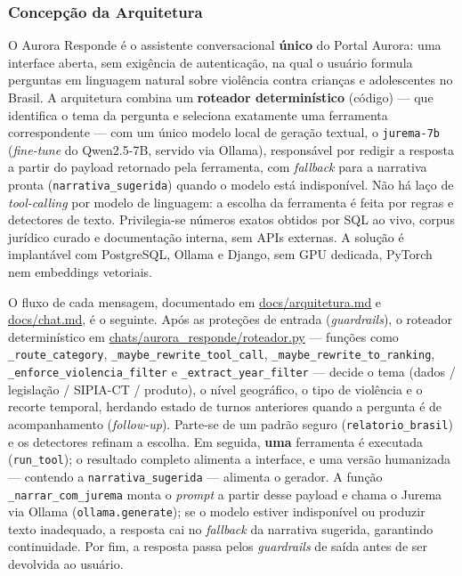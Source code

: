\documentclass[11pt,a4paper]{article}
\begin{document}
\subsubsection{Concepção da Arquitetura}
\label{subsubsec:arquitetura_meta4}

O Aurora Responde é o assistente conversacional \textbf{único} do Portal Aurora: uma interface aberta, sem exigência de autenticação, na qual o usuário formula perguntas em linguagem natural sobre violência contra crianças e adolescentes no Brasil. A arquitetura combina um \textbf{roteador determinístico} (código) — que identifica o tema da pergunta e seleciona exatamente uma ferramenta correspondente — com um único modelo local de geração textual, o \texttt{jurema-7b} (\textit{fine-tune} do Qwen2.5-7B, servido via Ollama), responsável por redigir a resposta a partir do payload retornado pela ferramenta, com \textit{fallback} para a narrativa pronta (\texttt{narrativa\_sugerida}) quando o modelo está indisponível. Não há laço de \textit{tool-calling} por modelo de linguagem: a escolha da ferramenta é feita por regras e detectores de texto. Privilegia-se números exatos obtidos por SQL ao vivo, corpus jurídico curado e documentação interna, sem APIs externas. A solução é implantável com PostgreSQL, Ollama e Django, sem GPU dedicada, PyTorch nem embeddings vetoriais.

O fluxo de cada mensagem, documentado em \url{docs/arquitetura.md} e \url{docs/chat.md}, é o seguinte. Após as proteções de entrada (\textit{guardrails}), o roteador determinístico em \url{chats/aurora_responde/roteador.py} — funções como \texttt{\_route\_category}, \texttt{\_maybe\_rewrite\_tool\_call}, \texttt{\_maybe\_rewrite\_to\_ranking}, \texttt{\_enforce\_violencia\_filter} e \texttt{\_extract\_year\_filter} — decide o tema (dados / legislação / SIPIA-CT / produto), o nível geográfico, o tipo de violência e o recorte temporal, herdando estado de turnos anteriores quando a pergunta é de acompanhamento (\textit{follow-up}). Parte-se de um padrão seguro (\texttt{relatorio\_brasil}) e os detectores refinam a escolha. Em seguida, \textbf{uma} ferramenta é executada (\texttt{run\_tool}); o resultado completo alimenta a interface, e uma versão humanizada — contendo a \texttt{narrativa\_sugerida} — alimenta o gerador. A função \texttt{\_narrar\_com\_jurema} monta o \textit{prompt} a partir desse payload e chama o Jurema via Ollama (\texttt{ollama.generate}); se o modelo estiver indisponível ou produzir texto inadequado, a resposta cai no \textit{fallback} da narrativa sugerida, garantindo continuidade. Por fim, a resposta passa pelos \textit{guardrails} de saída antes de ser devolvida ao usuário.
\end{document}
